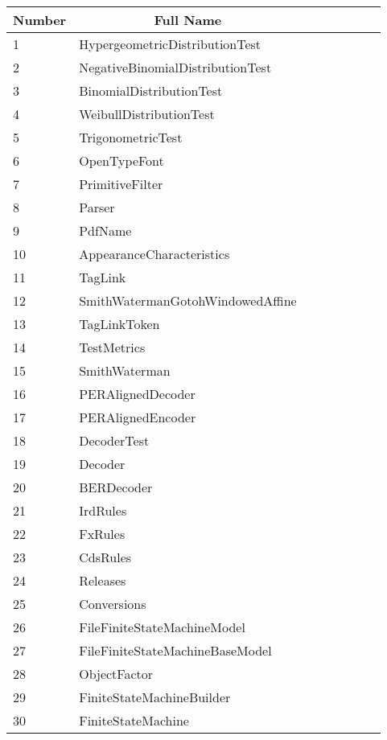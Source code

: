 \begin{table}[t]
\centering
\begin{SmallOut}
\begin {tabular} {|l|l|c|c|c|c|c|c|}
\hline
\multicolumn{1}{|c|}{\textbf{Number}}& \multicolumn{1}{|c|}{\textbf{Full Name}}\\
\hline\hline
1           & Hypergeometric\-Distribution\-Test\\
\hline
2           & Negative\-Binomial\-Distribution\-Test\\
\hline
3           &  BinomialDistributionTest\\
\hline
4           & WeibullDistributionTest \\
\hline
5           & TrigonometricTest \\
\hline
6           & OpenTypeFont \\
\hline
7           & PrimitiveFilter \\
\hline
8           & Parser\\
\hline
9           & PdfName \\      
\hline
10          & Appearance\-Characteristics\\
\hline
11          & TagLink \\
\hline
12          & Smith\-Waterman\-Gotoh\-Windowed\-Affine\\
\hline
13          & TagLinkToken \\
\hline
14          & TestMetrics \\
\hline
15          & SmithWaterman\\
\hline
16          & PERAlignedDecoder\\
\hline
17          & PERAlignedEncoder\\
\hline 
18          & DecoderTest \\
\hline
19          & Decoder \\
\hline
20          & BERDecoder\\
\hline
21          & IrdRules\\
\hline      
22          & FxRules\\
\hline
23          & CdsRules\\
\hline
24          & Releases\\
\hline
25          & Conversions\\    
\hline
26          & File\-Finite\-State\-Machine\-Model\\
\hline
27          & File\-Finite\-State\-Machine\-Base\-Model\\
\hline
28          & ObjectFactor\\
\hline
29          & Finite\-State\-Machine\-Builder\\
\hline
30          &FiniteStateMachine\\
\hline 
\end{tabular}%
 \label{table:abbreviation}
\end{SmallOut}%
\end{table}



